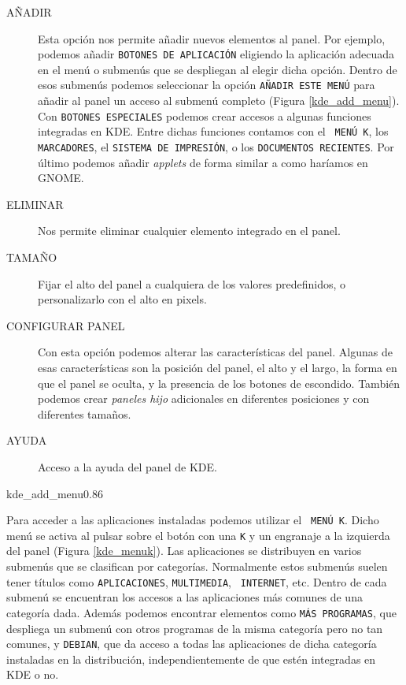 \begin{description}

\item[AÑADIR]  Esta  opción nos  permite  añadir  nuevos elementos  al
panel.  Por  ejemplo,  podemos  añadir  {\tt  BOTONES  DE  APLICACIÓN}
eligiendo  la  aplicación  adecuada  en  el menú  o  submenús  que  se
despliegan al  elegir dicha  opción. Dentro  de esos  submenús podemos
seleccionar  la opción  {\tt AÑADIR  ESTE MENÚ}  para añadir  al panel
un  acceso  al  submenú   completo  (Figura  \ref{kde_add_menu}).  Con
{\tt  BOTONES ESPECIALES}  podemos crear  accesos a  algunas funciones
integradas  en  KDE.  Entre  dichas funciones  contamos  con  el  {\tt
MENÚ  K}, los  {\tt  MARCADORES},  el {\tt  SISTEMA  DE IMPRESIÓN},  o
los  {\tt  DOCUMENTOS  RECIENTES}.  Por  último  podemos  añadir  {\em
applets} de  forma similar a como  haríamos en {\sf
GNOME}.

\item[ELIMINAR] Nos  permite eliminar cualquier elemento  integrado en
el panel.

\item[TAMAÑO]  Fijar el  alto del  panel a  cualquiera de  los valores
predefinidos, o personalizarlo con el alto en pixels.

\item[CONFIGURAR   PANEL]  Con   esta  opción   podemos  alterar   las
características  del panel.  Algunas  de esas  características son  la
posición del panel,  el alto y el  largo, la forma en que  el panel se
oculta, y  la presencia de  los botones de escondido.  También podemos
crear {\em  paneles hijo} adicionales  en diferentes posiciones  y con
diferentes tamaños.

\item[AYUDA] Acceso a la ayuda del panel de {\sf KDE}.

\end{description}

\begin{figura}{kde_add_menu}{0.86}
\caption{Añadir al panel un acceso al menú {\tt EDITORES}}
\label{kde_add_menu}
\end{figura}

Para acceder  a las aplicaciones  instaladas podemos utilizar  el {\tt
MENÚ K}. Dicho  menú se activa  al pulsar  sobre el
botón  con  una {\tt  K}  y  un engranaje  a  la  izquierda del  panel
(Figura \ref{kde_menuk}).  Las aplicaciones  se distribuyen  en varios
submenús que se clasifican  por categorías. Normalmente estos submenús
suelen tener  títulos como {\tt APLICACIONES},  {\tt MULTIMEDIA}, {\tt
INTERNET}, etc. Dentro de cada submenú se encuentran los accesos a las
aplicaciones  más  comunes  de  una  categoría  dada.  Además  podemos
encontrar elementos como {\tt MÁS PROGRAMAS}, que despliega un submenú
con  otros programas  de la  misma categoría  pero no  tan comunes,  y
{\tt  DEBIAN},  que  da  acceso  a todas  las  aplicaciones  de  dicha
categoría  instaladas en  la distribución,  independientemente de  que
estén integradas en {\sf KDE} o no.

